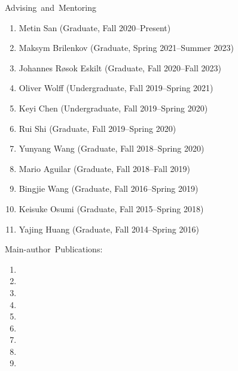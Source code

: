 \documentclass[a4paper]{resume}
\begin{document}
\begin{category}{\mbox{Advising and Mentoring}}
    \citemnobullet
    \noindent
    \begin{enumerate}[topsep=0pt,itemsep=0pt,partopsep=0pt,parsep=0pt]
        \item Metin San (Graduate, Fall 2020--Present)
        \item Maksym Brilenkov (Graduate, Spring 2021--Summer 2023)
        \item Johannes Røsok Eskilt (Graduate, Fall 2020--Fall 2023)
	\item Oliver Wolff (Undergraduate, Fall 2019--Spring 2021)
        \item Keyi Chen (Undergraduate, Fall 2019--Spring 2020)
        \item Rui Shi (Graduate, Fall 2019--Spring 2020)
	\item Yunyang Wang (Graduate, Fall 2018--Spring 2020)
        \item Mario Aguilar (Graduate, Fall 2018--Fall 2019)
        \item Bingjie Wang (Graduate, Fall 2016--Spring 2019)
        \item Keisuke Osumi (Graduate, Fall 2015--Spring 2018)
        \item Yajing Huang (Graduate, Fall 2014--Spring 2016)
    \end{enumerate}
\end{category}


\begin{category}{\mbox{Main-author Publications:}}
\citemnobullet\\
%

\noindent
\begin{enumerate}[topsep=0pt,itemsep=0pt,partopsep=0pt,parsep=0pt]
\item {}
\item {}
\item {}
\item {}
\item {}
\item {}
\item {}
\item {}
\item {}
\end{enumerate}
\end{category}
\end{document}
